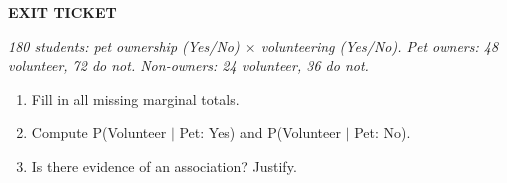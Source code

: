 \documentclass[aspectratio=169, 11pt]{beamer}
\begin{document}
{
\begin{frame}[t, plain]
  \vspace{0.45cm}\par
  \hspace{0.55cm}%
  \begin{minipage}{0.9\textwidth}
    {\color{goldacc}\bfseries\footnotesize\MakeUppercase{Exit Ticket}}
    \vspace{0.4cm}\par
    {\color{skymid}\small\itshape
      180 students: pet ownership (Yes/No) $\times$ volunteering (Yes/No).
      Pet owners: 48 volunteer, 72 do not. Non-owners: 24 volunteer, 36 do not.}
    \vspace{0.4cm}
    \small
    \begin{enumerate}
      \setlength{\itemsep}{0.45em}
      \item {\color{white}Fill in all missing marginal totals.}
      \item {\color{white}Compute P(Volunteer $|$ Pet: Yes) and P(Volunteer $|$ Pet: No).}
      \item {\color{white}Is there evidence of an association? Justify.}
    \end{enumerate}
  \end{minipage}
\end{frame}
}
\end{document}
